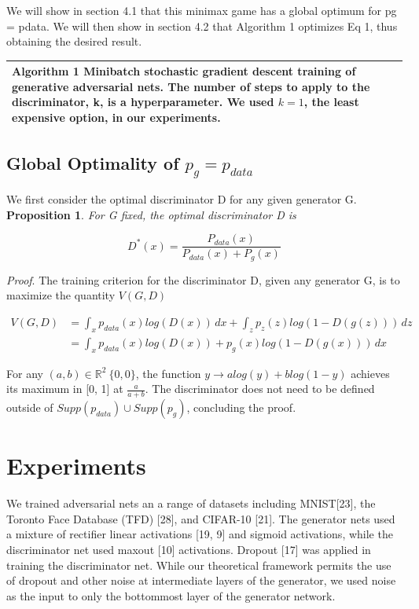 \documentclass{article}
\begin{document}
\setlength{\parskip}{1em}
\noindent
We will show in section 4.1 that this minimax game has a global optimum for pg = pdata. We will
then show in section 4.2 that Algorithm 1 optimizes Eq 1, thus obtaining the desired result.

\begin{table}[h]
    \begin{tabular*}{\textwidth}{p{\textwidth}} \\ \hline
        \textbf{Algorithm} 1 Minibatch stochastic gradient descent training of generative adversarial nets. The number of
       steps to apply to the discriminator, k, is a hyperparameter. We used $k = 1$, the least expensive option, in our
       experiments. 
       \\ \hline
   \end{tabular*}
\end{table}


\subsection{ Global Optimality of $p_g = p_{data}$}    
We first consider the optimal discriminator D for any given generator G.\\
\textbf{Proposition 1}. \textit{For G fixed, the optimal discriminator D is}

\[
D^*(x)= \frac{P_{data}(x)}{P_{data}(x)+P_{g}(x)}
\]

\textit{Proof}. The training criterion for the discriminator D, given any generator G, is to maximize the quantity $V (G, D)$

\begin{equation}
    \begin{split}
      V(G, D) & =    \int_{x}^{}  p_{data}(x)log(D(x))\,dx + \int_{z}^{}  p_{z}(z)log(1-D(g(z)))\,dz \\
      & = \int_{x}^{}  p_{data}(x)log(D(x)) + p_{g}(x)log(1-D(g(x)))\,dx
    \end{split}
\end{equation}

For any $(a, b) \in \mathbb{R}^2 \ \{0, 0\}$, the function 
$y \rightarrow  a log(y) + b log(1 - y)$ 
achieves its maximum in
[0, 1] at $\frac{a}{a+b}$. The discriminator does not need to be defined outside of 
$Supp(p_{data}) \cup Supp(p_g)$,
concluding the proof.
    
\section{Experiments}
We trained adversarial nets an a range of datasets including MNIST[23], the Toronto Face Database
(TFD) [28], and CIFAR-10 [21]. The generator nets used a mixture of rectifier linear activations [19,
9] and sigmoid activations, while the discriminator net used maxout [10] activations. Dropout [17]
was applied in training the discriminator net. While our theoretical framework permits the use of
dropout and other noise at intermediate layers of the generator, we used noise as the input to only
the bottommost layer of the generator network.
\end{document}
